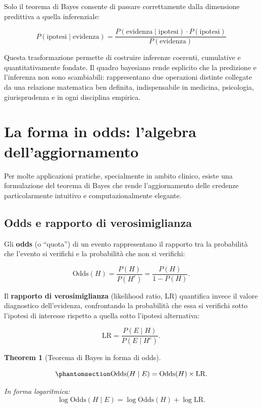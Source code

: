 \documentclass[
  letterpaper,
  DIV=11,
  numbers=noendperiod,
  oneside]{scrreprt}
\theoremstyle{definition}
\theoremstyle{plain}
\newtheorem{theorem}{Theorem}[chapter]
\theoremstyle{definition}
\theoremstyle{remark}
\begin{document}
Solo il teorema di Bayes consente di passare correttamente dalla
dimensione predittiva a quella inferenziale:

\[
P(\text{ipotesi} \mid \text{evidenza}) = \frac{P(\text{evidenza} \mid \text{ipotesi}) \cdot P(\text{ipotesi})}{P(\text{evidenza})}
\]

Questa trasformazione permette di costruire inferenze coerenti,
cumulative e quantitativamente fondate. Il quadro bayesiano rende
esplicito che la predizione e l'inferenza non sono scambiabili:
rappresentano due operazioni distinte collegate da una relazione
matematica ben definita, indispensabile in medicina, psicologia,
giurisprudenza e in ogni disciplina empirica.

\section{La forma in odds: l'algebra
dell'aggiornamento}\label{la-forma-in-odds-lalgebra-dellaggiornamento}

Per molte applicazioni pratiche, specialmente in ambito clinico, esiste
una formulazione del teorema di Bayes che rende l'aggiornamento delle
credenze particolarmente intuitivo e computazionalmente elegante.

\subsection{Odds e rapporto di
verosimiglianza}\label{odds-e-rapporto-di-verosimiglianza}

Gli \textbf{odds} (o ``quota'') di un evento rappresentano il rapporto
tra la probabilità che l'evento si verifichi e la probabilità che non si
verifichi:

\[
\text{Odds}(H) = \frac{P(H)}{P(H^c)} = \frac{P(H)}{1 - P(H)}.
\]

Il \textbf{rapporto di verosimiglianza} (likelihood ratio, LR)
quantifica invece il valore diagnostico dell'evidenza, confrontando la
probabilità che essa si verifichi sotto l'ipotesi di interesse rispetto
a quella sotto l'ipotesi alternativa:

\[
\text{LR} = \frac{P(E \mid H)}{P(E \mid H^c)}.
\]

\begin{theorem}[Teorema di Bayes in forma di
odds]\protect\hypertarget{thm-bayes-odds}{}\label{thm-bayes-odds}

\begin{equation}\phantomsection\label{eq-bayes-odds}{
\text{Odds}(H \mid E) = \text{Odds}(H) \times \text{LR}.
}\end{equation}

In forma logaritmica: \[
\log \text{Odds}(H \mid E) = \log \text{Odds}(H) + \log \text{LR}.
\]

\end{theorem}
\end{document}
